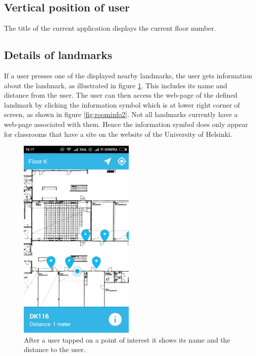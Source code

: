 \documentclass{article}
\begin{document}
\subsection{Vertical position of user} 

The title of the current application displays the current floor number.

\subsection{Details of landmarks} 

If a user presses one of the displayed nearby landmarks, the user gets information about the landmark, as illustrated in figure \ref{fig:roominfo}. This includes its name and distance from the user. The user can then access the web-page of the defined landmark by clicking the information symbol which is at lower right corner of screen, as shown in figure \ref{fig:roominfo2}. Not all landmarks currently have a web-page associated with them. Hence the information symbol does only appear for classrooms that have a site on the website of the University of Helsinki.

\begin{figure}
    \centering
    \includegraphics[width=0.5\textwidth]{Placeinfo}
    \caption{After a user tapped on a point of interest it shows its name and the distance to the user.}
    \label{fig:roominfo}
\end{figure}
\end{document}
